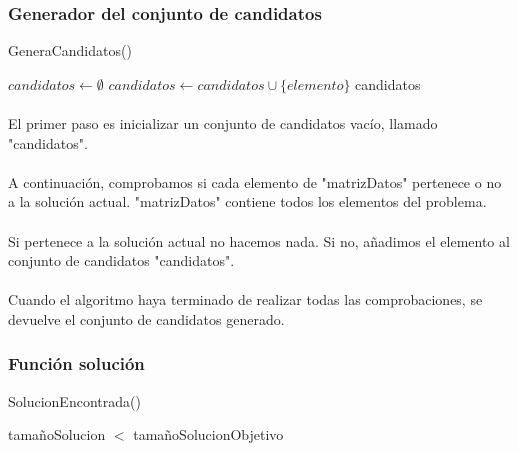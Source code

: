 \documentclass{article}
\begin{document}
	\subsubsection{Generador del conjunto de candidatos}
	\begin{algorithm}[H]
		\caption{GeneraCandidatos()}
		\begin{algorithmic}
			\STATE $candidatos \leftarrow \emptyset$
			\STATE $candidatos \leftarrow candidatos \cup \{elemento\}$
			\ENDIF
			\ENDFOR
			\RETURN candidatos
		\end{algorithmic}
	\end{algorithm}

	\paragraph{}El primer paso es inicializar un conjunto de candidatos vacío, llamado "candidatos".
	
	\paragraph{}A continuación, comprobamos si cada elemento de "matrizDatos" pertenece o no a la solución actual. "matrizDatos" contiene todos los elementos del problema.
	
	\paragraph{}Si pertenece a la solución actual no hacemos nada. Si no, añadimos el elemento al conjunto de candidatos "candidatos".
	
	\paragraph{}Cuando el algoritmo haya terminado de realizar todas las comprobaciones, se devuelve el conjunto de candidatos generado.

	\subsubsection{Función solución}
	\begin{algorithm}[H]
		\caption{SolucionEncontrada()}
		\begin{algorithmic}	
			\RETURN tamañoSolucion $<$ tamañoSolucionObjetivo 
		\end{algorithmic}
	\end{algorithm}
\end{document}
